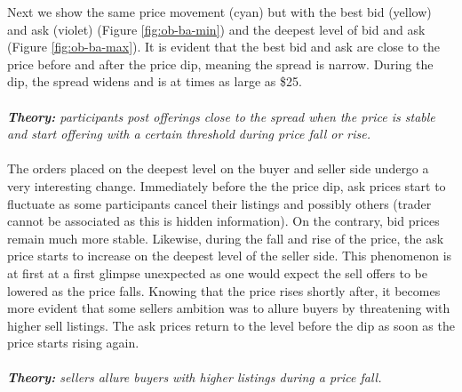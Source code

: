 Next we show the same price movement (cyan) but with the best bid (yellow) and ask (violet) (Figure \ref{fig:ob-ba-min}) and the deepest level of bid and ask (Figure \ref{fig:ob-ba-max}).
It is evident that the best bid and ask are close to the price before and after the price dip, meaning the spread is narrow.
During the dip, the spread widens and is at times as large as \$25.
\\
\\
\textit{\textbf{Theory:} participants post offerings close to the spread when the price is stable and start offering with a certain threshold during price fall or rise.}
\\
\\
The orders placed on the deepest level on the buyer and seller side undergo a very interesting change.
Immediately before the the price dip, ask prices start to fluctuate as some participants cancel their listings and possibly others (trader cannot be associated as this is hidden information).
On the contrary, bid prices remain much more stable.
Likewise, during the fall and rise of the price, the ask price starts to increase on the deepest level of the seller side. 
This phenomenon is at first at a first glimpse unexpected as one would expect the sell offers to be lowered as the price falls.
Knowing that the price rises shortly after, it becomes more evident that some sellers ambition was to allure buyers by threatening with higher sell listings.
The ask prices return to the level before the dip as soon as the price starts rising again.
\\
\\
\textit{\textbf{Theory:} sellers allure buyers with higher listings during a price fall.}
\\
